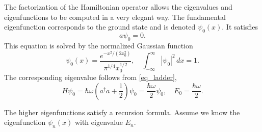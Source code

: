 \documentclass[11pt]{article}
\begin{document}
The factorization of the Hamiltonian operator allows the eigenvalues and eigenfunctions to be
computed in a very elegant way. The fundamental eigenfunction corresponds to the ground state and is
denoted $\psi_0(x)$. It satisfies
\[
a \psi_0 = 0.
\]
This equation is solved by the normalized Gaussian function
\[
\psi_0(x) = \frac{e^{-x^2/(2 x_0^2)}}{\pi^{1/4} x_0^{1/2}},\quad \int_{-\infty}^\infty |\psi_0|^2 \,
dx = 1.
\]
The corresponding eigenvalue follows from \eqref{eq_ladder},
\[
H\psi_0 = \hbar\omega\left( a^\dag a + \frac{1}{2} \right)\psi_0 = \frac{\hbar\omega}{2}
\psi_0,\quad E_0 = \frac{\hbar\omega}{2}.
\]

The higher eigenfunctions satisfy a recursion formula. Assume we know the eigenfunction $\psi_n(x)$
with eigenvalue $E_n$.






\end{document}
